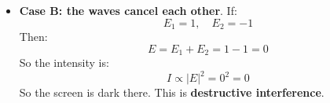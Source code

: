 \begin{examplebox}
\begin{itemize}
        \item \textbf{Case B: the waves cancel each other}. If:
            \begin{equation*}
                E_1 = 1, \quad E_2 = -1
            \end{equation*}
            Then:
            \begin{equation*}
                E = E_1 + E_2 = 1 - 1 = 0
            \end{equation*}
            So the intensity is:
            \begin{equation*}
                I \propto \left|E\right|^{2} = 0^{2} = 0
            \end{equation*}
            So the screen is dark there. This is \textbf{destructive interference}.
    \end{itemize}
\end{examplebox}

